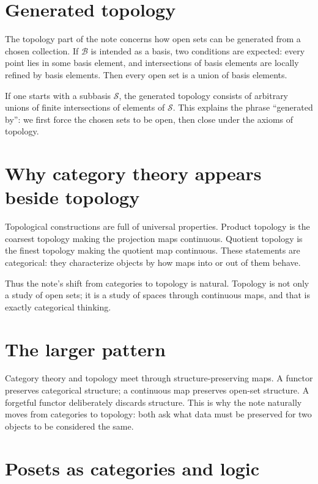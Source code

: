 \section{Generated topology}

The topology part of the note concerns how open sets can be generated from a chosen collection.  If \(\mathcal B\) is intended as a basis, two conditions are expected: every point lies in some basis element, and intersections of basis elements are locally refined by basis elements.  Then every open set is a union of basis elements.

If one starts with a subbasis \(\mathcal S\), the generated topology consists of arbitrary unions of finite intersections of elements of \(\mathcal S\).  This explains the phrase “generated by”: we first force the chosen sets to be open, then close under the axioms of topology.

\section{Why category theory appears beside topology}

Topological constructions are full of universal properties.  Product topology is the coarsest topology making the projection maps continuous.  Quotient topology is the finest topology making the quotient map continuous.  These statements are categorical: they characterize objects by how maps into or out of them behave.

Thus the note's shift from categories to topology is natural.  Topology is not only a study of open sets; it is a study of spaces through continuous maps, and that is exactly categorical thinking.

\section{The larger pattern}

Category theory and topology meet through structure-preserving maps.  A functor preserves categorical structure; a continuous map preserves open-set structure.  A forgetful functor deliberately discards structure.  This is why the note naturally moves from categories to topology: both ask what data must be preserved for two objects to be considered the same.

\section{Posets as categories and logic}


